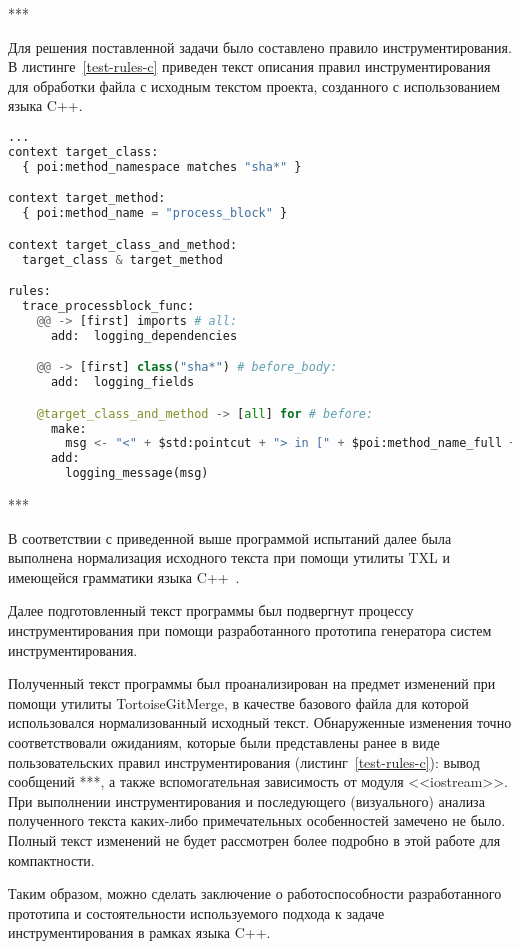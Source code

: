 ***

Для решения поставленной задачи было составлено правило инструментирования.
В листинге~\ref{test-rules-c} приведен текст описания правил инструментирования для обработки файла с исходным текстом проекта, созданного с использованием языка C++.

\begin{lstlisting}[frame=single, language=Python, label={test-rules-c}, caption={Описание правил инструментирования. C++-проект.}]
...
context target_class:
  { poi:method_namespace matches "sha*" }

context target_method:
  { poi:method_name = "process_block" }

context target_class_and_method:
  target_class & target_method

rules:
  trace_processblock_func:
    @@ -> [first] imports # all:
      add:  logging_dependencies

    @@ -> [first] class("sha*") # before_body:
      add:  logging_fields

    @target_class_and_method -> [all] for # before:
      make:
        msg <- "<" + $std:pointcut + "> in [" + $poi:method_name_full + "] method";
      add:
        logging_message(msg)
\end{lstlisting}

***

В соответствии с приведенной выше программой испытаний далее была выполнена нормализация исходного текста при помощи утилиты TXL и имеющейся грамматики языка C++~\cite{txl-resources}.

Далее подготовленный текст программы был подвергнут процессу инструментирования при помощи разработанного прототипа генератора систем инструментирования.

Полученный текст программы был проанализирован на предмет изменений при помощи утилиты TortoiseGitMerge, в качестве базового файла для которой использовался нормализованный исходный текст.
Обнаруженные изменения точно соответствовали ожиданиям, которые были представлены ранее в виде пользовательских правил инструментирования (листинг~\ref{test-rules-c}):
вывод сообщений ***,
а также вспомогательная зависимость от модуля <<iostream>>.
При выполнении инструментирования и последующего (визуального) анализа полученного текста каких-либо примечательных особенностей замечено не было.
Полный текст изменений не будет рассмотрен более подробно в этой работе для компактности.

Таким образом, можно сделать заключение о работоспособности разработанного прототипа и состоятельности используемого подхода к задаче инструментирования в рамках языка C++.

